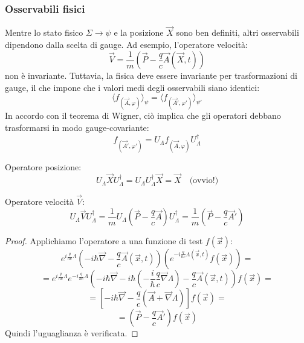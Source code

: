 \subsubsection{Osservabili fisici}

Mentre lo stato fisico \(\Sigma \to \psi\) e la posizione \(\vec{X}\) sono ben definiti, altri osservabili dipendono dalla scelta di gauge. Ad esempio, l'operatore velocità:
\[
\vec{V} = \frac{1}{m} \left( \vec{P} - \frac{q}{c} \vec{A}(\vec{X}, t) \right)
\]
non è invariante. Tuttavia, la fisica deve essere invariante per trasformazioni di gauge, il che impone che i valori medi degli osservabili siano identici:
\[
\langle f_{(\vec{A}, \varphi)} \rangle_\psi = \langle f_{(\vec{A}', \varphi')} \rangle_{\psi'}
\]
In accordo con il teorema di Wigner, ciò implica che gli operatori debbano trasformarsi in modo gauge-covariante:
\begin{equation}
    f_{(\vec{A}', \varphi')} = U_\Lambda f_{(\vec{A}, \varphi)} U_\Lambda^\dagger
\end{equation}

\begin{example}Operatore posizione:
        \[ U_{\Lambda} \vec{X} U_{\Lambda}^{\dagger} = U_{\Lambda} U_{\Lambda}^{\dagger} \vec{X} = \vec{X} \quad \text{(ovvio!)} \]
\end{example}
\begin{example}Operatore velocità \( \vec{V} \):
        \[ U_{\Lambda} \vec{V} U_{\Lambda}^{\dagger} = \frac{1}{m} U_{\Lambda} \left( \vec{P} - \frac{q}{c} \vec{A} \right) U_{\Lambda}^{\dagger} = \frac{1}{m} \left(\vec{P} - \frac{q}{c} \vec{A}' \right)\]
\end{example}

\begin{proof}
    Applichiamo l'operatore a una funzione di test \( f(\vec{x}) \):
    \[ e^{i\frac{q}{\hbar c} \Lambda} \left( -i\hbar\vec{\nabla} - \frac{q}{c} \vec{A}(\vec{x},t) \right) \left( e^{-i\frac{q}{\hbar c} \Lambda(\vec{x},t)} f(\vec{x}) \right) = \]
    \[ = e^{i\frac{q}{\hbar c} \Lambda} e^{-i\frac{q}{\hbar c} \Lambda} \left( -i\hbar\vec{\nabla} - i\hbar \left( -\frac{i}{\hbar} \frac{q}{c} \vec{\nabla}\Lambda \right) - \frac{q}{c} \vec{A}(\vec{x},t) \right) f(\vec{x}) = \]
    \[ = \left[ -i\hbar\vec{\nabla} - \frac{q}{c} \left( \vec{A} + \vec{\nabla}\Lambda \right) \right] f(\vec{x}) = \]
    \[ = \left( \vec{P} - \frac{q}{c} \vec{A}' \right) f(\vec{x}) \]
    Quindi l'uguaglianza è verificata.
\end{proof}

